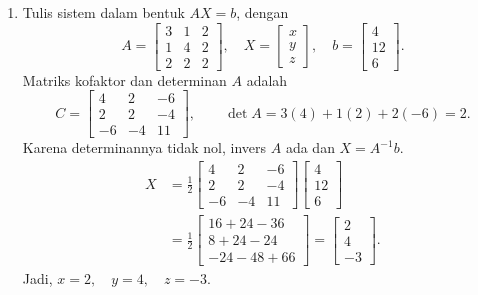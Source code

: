 \documentclass[11pt,a4paper]{article}
\begin{document}
\begin{enumerate}
    \item Tulis sistem dalam bentuk $AX=b$, dengan
    \[
        A=\begin{bmatrix}3&1&2\\1&4&2\\2&2&2\end{bmatrix},
        \quad X=\begin{bmatrix}x\\y\\z\end{bmatrix},
        \quad b=\begin{bmatrix}4\\12\\6\end{bmatrix}.
    \]
    Matriks kofaktor dan determinan $A$ adalah
    \[
        C=\begin{bmatrix}4&2&-6\\2&2&-4\\-6&-4&11\end{bmatrix},
        \qquad \det A=3(4)+1(2)+2(-6)=2.
    \]
    Karena determinannya tidak nol, invers $A$ ada dan $X=A^{-1}b$.
    \begin{align*}
        X&=\frac12
            \begin{bmatrix}4&2&-6\\2&2&-4\\-6&-4&11\end{bmatrix}
            \begin{bmatrix}4\\12\\6\end{bmatrix}\\
            &=\frac12\begin{bmatrix}16+24-36\\8+24-24\\-24-48+66\end{bmatrix}
            =\begin{bmatrix}2\\4\\-3\end{bmatrix}.
    \end{align*}
    Jadi, $\boxed{x=2,\quad y=4,\quad z=-3}$.
\end{enumerate}
\end{document}
